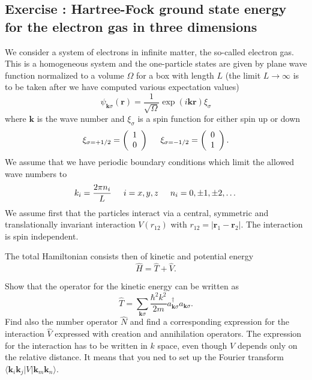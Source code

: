 \documentclass[graybox,sectrefs,envcountresetchap,open=right]{svmonodo}
\newenvironment{doconceexercise}{}{}
\newcounter{doconceexercisecounter}
\begin{document}
\begin{doconceexercise}

\subsection*{Exercise \thedoconceexercisecounter: Hartree-Fock ground state energy for the  electron gas in three dimensions}


We consider a system of electrons in infinite matter, the so-called electron gas. This is a homogeneous system and the one-particle states are given by plane wave function normalized to a volume $\Omega$ 
for a box with length $L$ (the limit $L\rightarrow \infty$ is to be taken after we have computed various expectation values)
\[
\psi_{\mathbf{k}\sigma}(\mathbf{r})= \frac{1}{\sqrt{\Omega}}\exp{(i\mathbf{kr})}\xi_{\sigma}
\]
where $\mathbf{k}$ is the wave number and  $\xi_{\sigma}$ is a spin function for either spin up or down
\[ 
\xi_{\sigma=+1/2}=\left(\begin{array}{c} 1 \\ 0 \end{array}\right) \hspace{0.5cm}
\xi_{\sigma=-1/2}=\left(\begin{array}{c} 0 \\ 1 \end{array}\right).
\]
We assume that we have periodic boundary conditions which limit the allowed wave numbers to
\[
k_i=\frac{2\pi n_i}{L}\hspace{0.5cm} i=x,y,z \hspace{0.5cm} n_i=0,\pm 1,\pm 2, \dots
\]
We assume first that the particles interact via a central, symmetric and translationally invariant
interaction  $V(r_{12})$ with
$r_{12}=|\mathbf{r}_1-\mathbf{r}_2|$.  The interaction is spin independent.

The total Hamiltonian consists then of kinetic and potential energy
\[
\hat{H} = \hat{T}+\hat{V}.
\]


Show that the operator for the kinetic energy can be written as
\[
\hat{T}=\sum_{\mathbf{k}\sigma}\frac{\hbar^2k^2}{2m}a_{\mathbf{k}\sigma}^{\dagger}a_{\mathbf{k}\sigma}.
\]
Find also the number operator $\hat{N}$ and find a corresponding expression for the interaction
$\hat{V}$ expressed with creation and annihilation operators.   The expression for the interaction
has to be written in  $k$ space, even though $V$ depends only on the relative distance. It means that you ned to set up the Fourier transform $\langle \mathbf{k}_i\mathbf{k}_j| V | \mathbf{k}_m\mathbf{k}_n\rangle$.


\end{doconceexercise}
\end{document}
